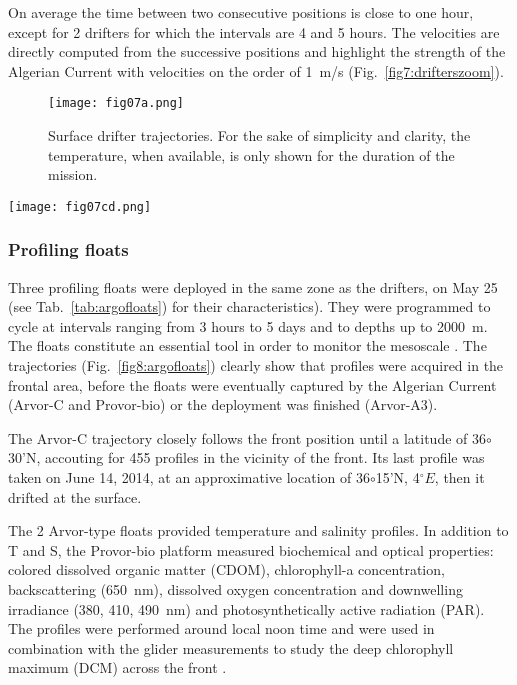 \documentclass[essd]{copernicus}
\begin{document}
On average the time between two consecutive positions is close to one hour, except for 2 drifters for which the intervals are 4 and 5 hours. The velocities are directly computed from the successive positions and highlight the strength of the Algerian Current with velocities on the order of 1~m/s (Fig.~\ref{fig7:drifterszoom}).    

\begin{figure}[t]
\texttt{[image: fig07a.png]}
\caption{Surface drifter trajectories. For the sake of simplicity and clarity, the temperature, when available, is only shown for the duration of the mission.\label{fig3:drifters}}
\end{figure}

\begin{figure*}[h]
\texttt{[image: fig07cd.png]}
\caption{Drifter temperature (left-hand side) and velocity in the area of study.\label{fig7:drifterszoom}}
\end{figure*}


\subsubsection{Profiling floats}

Three profiling floats were deployed in the same zone as the drifters, on May 25 (see Tab.~\ref{tab:argofloats}) for their characteristics). They were programmed to cycle at intervals ranging from 3 hours to 5 days and to depths up to 2000~m. The floats constitute an essential tool in order to monitor the mesoscale \citep{SANCHEZROMAN17}. The trajectories (Fig.~\ref{fig8:argofloats}) clearly show that profiles were acquired in the frontal area, before the floats were eventually captured by the Algerian Current (Arvor-C and Provor-bio) or the deployment was finished (Arvor-A3). 

The Arvor-C trajectory closely follows the front position until a latitude of 36$\circ$30'N, accouting for 455 profiles in the vicinity of the front. Its last profile was taken on June 14, 2014, at an approximative location of 36$\circ$15'N, 4$^{\circ}E$, then it drifted at the surface.

The 2 Arvor-type floats provided temperature and salinity profiles. In addition to T and S, the Provor-bio platform measured biochemical and optical properties: colored dissolved organic matter (CDOM), chlorophyll-a concentration, backscattering (650~nm), dissolved oxygen concentration and downwelling  irradiance (380, 410, 490~nm) and photosynthetically active radiation (PAR). The profiles were performed around local noon time and were used in combination with the glider measurements to study the deep chlorophyll maximum (DCM) across the front \citep{OLITA17}.
\end{document}
